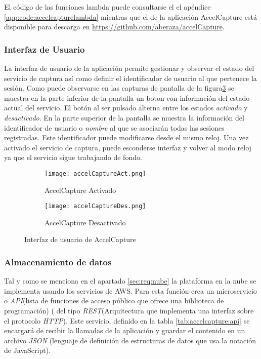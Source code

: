 
El código de las funciones lambda puede consultarse el el apéndice \ref{app:code:accelcapturelambda} mientras que el de la aplicación AccelCapture está disponible para descarga en \url{https://github.com/aberaza/accelCapture}.

\subsubsection{Interfaz de Usuario}

La interfaz de usuario de la aplicación permite gestionar y observar el estado del servicio de captura así como definir el identificador de usuario al que pertenece la sesión. Como puede observarse en las capturas de pantalla de la figura\ref{fig:accelcapture:UI} se muestra en la parte inferior de la pantalla un boton con información del estado actual del servicio. El botón al ser pulsado alterna entre los estados \textit{activado} y \textit{desactivado}. En la parte superior de la pantalla se muestra la información del identificador de usuario o \textit{nombre} al que se asociarán todas las sesiones registradas. Este identificador puede modificarse desde el mismo reloj. Una vez activado el servicio de captura, puede esconderse interfaz y volver al modo reloj ya que el servicio sigue trabajando de fondo. 
\begin{figure}[htb!]
  \centering
  \begin{subfigure}[b]{0.4\textwidth}
      \centering
      \texttt{[image: accelCaptureAct.png]}
      \caption{AccelCapture Activado}
      \label{fig:accelCapture:UI1}
  \end{subfigure}
  \hfill
  \begin{subfigure}[b]{0.4\textwidth}
      \centering
      \texttt{[image: accelCaptureDes.png]}
      \caption{AccelCapture Desactivado}
      \label{fig:accelCapture:UI2}
  \end{subfigure}
  \caption{\label{fig:accelcapture:UI} Interfaz de usuario de AccelCapture}
\end{figure}

\subsubsection{Almacenamiento de datos}

Tal y como se menciona en el apartado \ref{sec:req:nube} la plataforma en la nube se implementa usando los servicios de AWS. Para esta función crea un microservicio o \textit{API}(lista de funciones de acceso público que ofrece una biblioteca de programación) ( del tipo \textit{REST}(Arquitectura que implementa una interfaz sobre el protocolo \textit{HTTP}). Este servicio, definido en la tabla \ref{tab:accelcapture:api} se encargará de recibir la llamadas de la aplicación y guardar el contenido en un archivo \textit{JSON} (lenguaje de definición de estructuras de datos que usa la notación de JavaScript).

